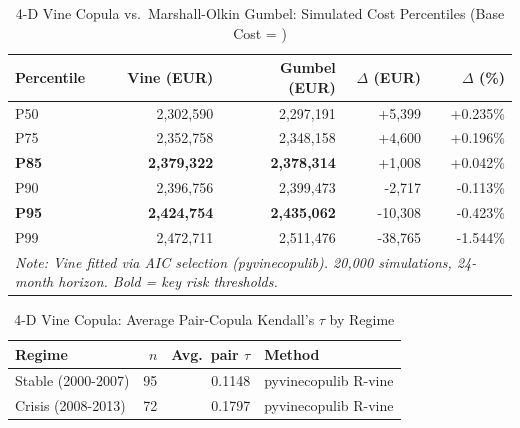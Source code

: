 \begin{table}[htbp]
\centering
\caption{4-D Vine Copula vs.\ Marshall-Olkin Gumbel: Simulated Cost Percentiles (Base Cost = )}
\label{tab:vine_comparison}
\begin{tabular}{lrrrr}
\toprule
Percentile & Vine (EUR) & Gumbel (EUR) & $\Delta$ (EUR) & $\Delta$ (\%) \\
\midrule
P50 & 2,302,590 & 2,297,191 & +5,399 & +0.235\% \\
P75 & 2,352,758 & 2,348,158 & +4,600 & +0.196\% \\
\textbf{P85} & \textbf{2,379,322} & \textbf{2,378,314} & +1,008 & +0.042\% \\
P90 & 2,396,756 & 2,399,473 & -2,717 & -0.113\% \\
\textbf{P95} & \textbf{2,424,754} & \textbf{2,435,062} & -10,308 & -0.423\% \\
P99 & 2,472,711 & 2,511,476 & -38,765 & -1.544\% \\
\bottomrule
\multicolumn{5}{l}{\footnotesize \textit{Note: Vine fitted via AIC selection (pyvinecopulib). 20{,}000 simulations, 24-month horizon. Bold = key risk thresholds.}} \\
\end{tabular}
\end{table}



\begin{table}[htbp]
\centering
\caption{4-D Vine Copula: Average Pair-Copula Kendall's $\tau$ by Regime}
\label{tab:vine_regime}
\begin{tabular}{lrrl}
\toprule
Regime & $n$ & Avg.\ pair $\tau$ & Method \\
\midrule
Stable (2000-2007) & 95 & 0.1148 & pyvinecopulib R-vine \\
Crisis (2008-2013) & 72 & 0.1797 & pyvinecopulib R-vine \\
\bottomrule
\end{tabular}
\end{table}